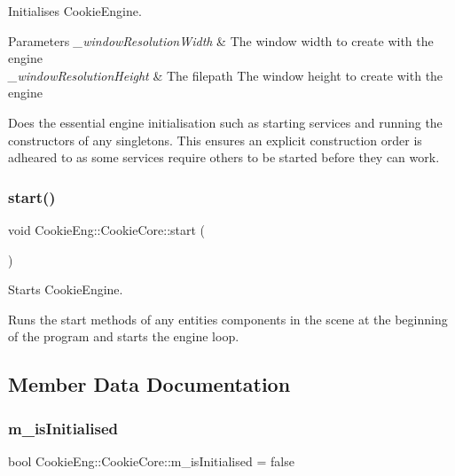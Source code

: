 Initialises Cookie\+Engine. 


\begin{DoxyParams}{Parameters}
{\em \+\_\+window\+Resolution\+Width} & The window width to create with the engine \\
\hline
{\em \+\_\+window\+Resolution\+Height} & The filepath The window height to create with the engine\\
\hline
\end{DoxyParams}
Does the essential engine initialisation such as starting services and running the constructors of any singletons. This ensures an explicit construction order is adheared to as some services require others to be started before they can work. \mbox{\label{class_cookie_eng_1_1_cookie_core_a30f6d3ab2c753095de7d61c69dddbd87}} 
\subsubsection{\texorpdfstring{start()}{start()}}
{\footnotesize\ttfamily void Cookie\+Eng\+::\+Cookie\+Core\+::start (\begin{DoxyParamCaption}{ }\end{DoxyParamCaption})}



Starts Cookie\+Engine. 

Runs the start methods of any entitie\textquotesingle{}s components in the scene at the beginning of the program and starts the engine loop. 

\subsection{Member Data Documentation}
\mbox{\label{class_cookie_eng_1_1_cookie_core_a56072701bf07b2f787081cf41f5ae254}} 
\subsubsection{\texorpdfstring{m\+\_\+is\+Initialised}{m\_isInitialised}}
{\footnotesize\ttfamily bool Cookie\+Eng\+::\+Cookie\+Core\+::m\+\_\+is\+Initialised = false\hspace{0.3cm}{\ttfamily [protected]}}

